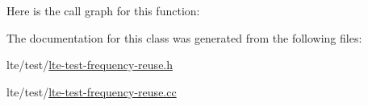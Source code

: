 Here is the call graph for this function\+:




The documentation for this class was generated from the following files\+:\begin{DoxyCompactItemize}
\item 
lte/test/\hyperlink{lte-test-frequency-reuse_8h}{lte-\/test-\/frequency-\/reuse.\+h}\item 
lte/test/\hyperlink{lte-test-frequency-reuse_8cc}{lte-\/test-\/frequency-\/reuse.\+cc}\end{DoxyCompactItemize}
